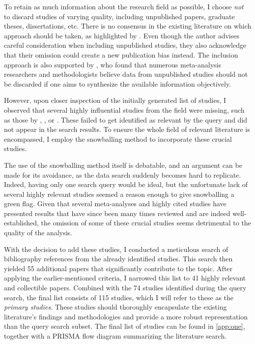 To retain as much information about the research field as possible, I choose \textit{not} to discard studies of varying quality, including unpublished papers, graduate theses, dissertations, etc. There is no consensus in the existing literature on which approach should be taken, as highlighted by \cite{stanley2001wheat}. Even though the author advises careful consideration when including unpublished studies, they also acknowledge that their omission could create 
a new publication bias instead. The inclusion approach is also supported by \cite{cook1993should}, who found that numerous meta-analysis researchers and methodologists believe data from unpublished studies should not be discarded if one aims to synthesize the available information objectively.

However, upon closer inspection of the initially generated list of studies, I observed that several highly influential studies from the field were missing, such as those by  \cite{angrist1991compulsory}, \cite{staiger1997instrumental}, or \cite{heckman2006earnings}. These failed to get identified as relevant by the query and did not appear in the search results. To ensure the whole field of relevant literature is encompassed, I employ the snowballing method to incorporate these crucial studies. 

The use of the snowballing method itself is debatable, and an argument can be made for its avoidance, as the data search suddenly becomes hard to replicate. Indeed, having only one search query would be ideal, but the unfortunate lack of several highly relevant studies seemed a reason enough to give snowballing a green flag. Given that several meta-analyses \citep{psacharopoulos1994meta, fleisher2005meta, psacharopoulos2018meta} and highly cited studies \citep{card1995using, heckman2006earnings, psacharopoulos2018meta} have presented results that have since been many times reviewed and are indeed well-established, the omission of some of these crucial studies seems detrimental to the quality of the analysis.

With the decision to add these studies, I conducted a meticulous search of bibliography references from the already identified studies. This search then yielded 55 additional papers that significantly contribute to the topic. After applying the earlier-mentioned criteria, I narrowed this list to 41 highly relevant and collectible papers. Combined with the 74 studies identified during the query search, the final list consists of 115 studies, which I will refer to these as the \textit{primary studies}. These studies should thoroughly encapsulate the existing literature's findings and methodologies and provide a more robust representation than the query search subset. The final list of studies can be found in \autoref{app:one}, together with a PRISMA flow diagram summarizing the literature search.

